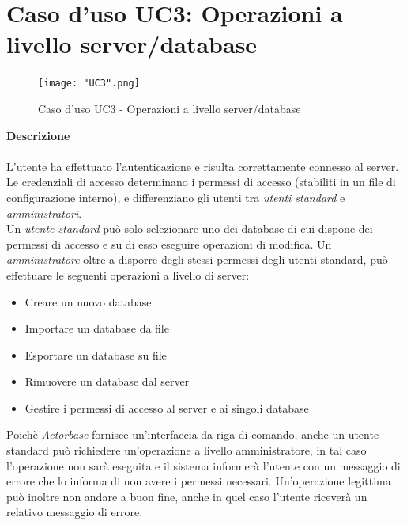 \documentclass[a4paper]{report}
\begin{document}
	 \section{Caso d'uso UC3: Operazioni a livello server/database}
	 	\begin{figure}[H]
			\centering
			\texttt{[image: "UC3".png]}
			\caption{Caso d'uso UC3 - Operazioni a livello server/database}
		\end{figure}
	 \textbf{Descrizione} \\ \\
	 L'utente ha effettuato l'autenticazione e risulta correttamente connesso al server. Le credenziali di
	 accesso determinano i permessi di accesso (stabiliti in un file di configurazione interno), e differenziano
	 gli utenti tra \emph{utenti standard} e \emph{amministratori}. \\
	 Un \emph{utente standard} può solo selezionare uno dei database di cui dispone dei permessi di
	  accesso e su di esso eseguire operazioni di modifica.
	 Un \emph{amministratore} oltre a disporre degli stessi permessi degli utenti standard, può effettuare
	 le seguenti operazioni a livello di server:
	 \begin{itemize}
	 	\item Creare un nuovo database
	 	\item Importare un database da file
	 	\item Esportare un database su file
	 	\item Rimuovere un database dal server
	 	\item Gestire i permessi di accesso al server e ai singoli database
	 \end{itemize}
	 Poichè \emph{Actorbase} fornisce un'interfaccia da riga di comando, anche un utente standard può
	 richiedere un'operazione a livello amministratore, in tal caso l'operazione non sarà eseguita e il 
	 sistema informerà l'utente con un messaggio di errore che lo informa di non avere i permessi 
	 necessari. Un'operazione legittima può inoltre non andare a buon fine, anche in quel caso l'utente 
	 riceverà un relativo messaggio di errore.
\end{document}

